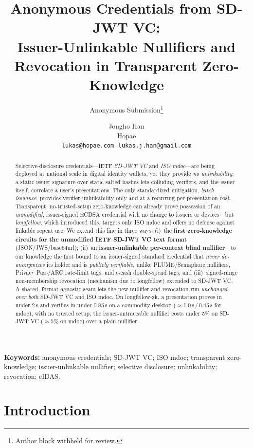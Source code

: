 \documentclass[11pt]{article}
\title{Anonymous Credentials from SD-JWT VC:\\
Issuer-Unlinkable Nullifiers and Revocation in Transparent Zero-Knowledge}
\author{Anonymous Submission\thanks{Author block withheld for review.}}
\author{Jongho Han\\ Hopae \\ \texttt{lukas@hopae.com}\,$\cdot$\,\texttt{lukas.j.han@gmail.com}}
\date{}
\theoremstyle{plain}
\theoremstyle{definition}
\begin{document}
\maketitle

\begin{abstract}
Selective-disclosure credentials---IETF \emph{SD-JWT VC} and \emph{ISO mdoc}---are
being deployed at national scale in digital identity wallets, yet they provide
\emph{no unlinkability}: a static issuer signature over static salted hashes lets
colluding verifiers, and the issuer itself, correlate a user's presentations. The
only standardized mitigation, \emph{batch issuance}, provides verifier-unlinkability
only and at a recurring per-presentation cost. Transparent, no-trusted-setup
zero-knowledge can already prove possession of an \emph{unmodified}, issuer-signed
ECDSA credential with no change to issuers or devices---but \emph{longfellow}, which
introduced this, targets only ISO mdoc and offers no defense against linkable repeat
use. We extend this line in three ways: (i)~the \textbf{first zero-knowledge circuits
for the unmodified IETF SD-JWT VC text format} (JSON/JWS/base64url); (ii)~an
\textbf{issuer-unlinkable per-context blind nullifier}---to our knowledge the first
bound to an issuer-signed standard credential that \emph{never de-anonymizes} its
holder and is \emph{publicly verifiable}, unlike PLUME/Semaphore nullifiers, Privacy
Pass/ARC rate-limit tags, and e-cash double-spend tags; and (iii)~signed-range
non-membership revocation (mechanism due to longfellow) extended to SD-JWT VC. A
shared, format-agnostic seam lets the new nullifier and revocation run \emph{unchanged
over both} SD-JWT VC and ISO mdoc. On longfellow-zk, a presentation proves in under
2\,s and verifies in under 0.85\,s on a commodity desktop
($\approx$1.0\,s\,/\,0.45\,s for mdoc), with no trusted setup; the issuer-untraceable
nullifier costs under 5\% on SD-JWT VC ($\approx$5\% on mdoc) over a plain nullifier.
\end{abstract}

\noindent\textbf{Keywords:} anonymous credentials; SD-JWT VC; ISO mdoc; transparent
zero-knowledge; issuer-unlinkable nullifier; selective disclosure; unlinkability;
revocation; eIDAS.

\section{Introduction}\label{sec:intro}
\end{document}
